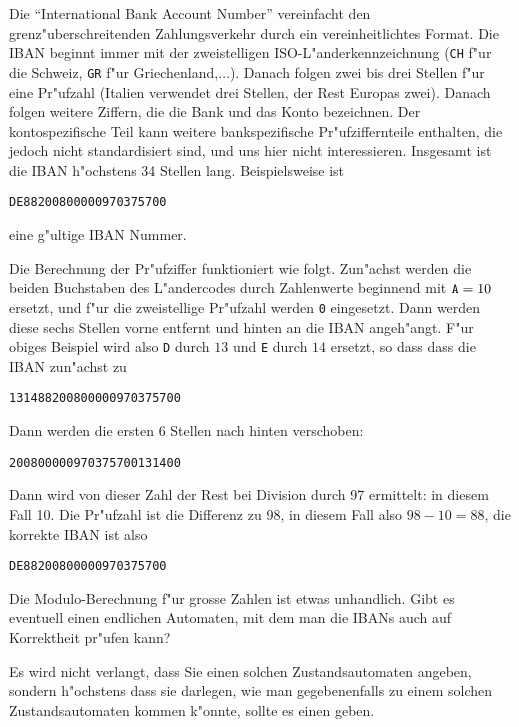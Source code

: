 Die ``International Bank Account Number'' vereinfacht den
grenz"uberschreitenden Zahlungsverkehr durch ein vereinheitlichtes
Format. Die IBAN beginnt immer mit der zweistelligen ISO-L"anderkennzeichnung
({\tt CH} f"ur die Schweiz, {\tt GR} f"ur Griechenland,$\dots$). Danach
folgen zwei bis drei Stellen f"ur eine Pr"ufzahl (Italien verwendet
drei Stellen, der Rest Europas zwei).
Danach folgen weitere Ziffern, die die Bank und das Konto bezeichnen.
Der kontospezifische Teil kann weitere bankspezifische Pr"ufziffernteile
enthalten, die jedoch nicht standardisiert sind, und uns hier nicht
interessieren.
Insgesamt ist die IBAN h"ochstens 34 Stellen lang.
Beispielsweise ist
\begin{center}
{\tt DE88200800000970375700}
\end{center}
eine g"ultige IBAN Nummer.

Die Berechnung der Pr"ufziffer funktioniert wie folgt.
Zun"achst
werden die beiden Buchstaben des L"andercodes durch Zahlenwerte
beginnend mit $\text{\tt A}=10$ ersetzt, und f"ur die zweistellige
Pr"ufzahl werden {\tt 0} eingesetzt. Dann werden diese sechs Stellen
vorne entfernt und hinten an die IBAN angeh"angt. F"ur obiges Beispiel
wird also {\tt D} durch $13$ und {\tt E} durch $14$ ersetzt, so dass dass die 
IBAN zun"achst zu
\begin{center}
{\tt 131488200800000970375700}
\end{center}
Dann werden die ersten 6 Stellen nach hinten verschoben:
\begin{center}
{\tt 200800000970375700131400}
\end{center}
Dann wird von dieser Zahl der Rest bei Division durch 97 ermittelt:
in diesem Fall 10. Die Pr"ufzahl ist die Differenz zu 98, in diesem
Fall also $98-10=88$, die korrekte IBAN ist also
\begin{center}
{\tt DE88200800000970375700}
\end{center}

Die Modulo-Berechnung f"ur grosse Zahlen ist etwas unhandlich.
Gibt es eventuell einen endlichen Automaten, mit dem man die IBANs
auch auf Korrektheit pr"ufen kann?

\begin{hinweis}
Es wird nicht verlangt, dass Sie einen solchen Zustandsautomaten angeben,
sondern h"ochstens dass sie darlegen, wie man gegebenenfalls zu einem solchen
Zustandsautomaten kommen k"onnte, sollte es einen geben.
\end{hinweis}


